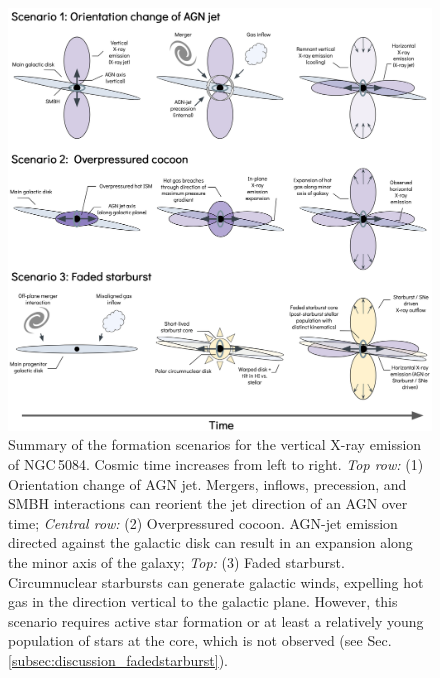 \documentclass[modern]{CORE-AAS/aastex631}
\begin{document}
\begin{figure}[t!]
\begin{center}
% 
\includegraphics[trim={0 0 0 0}, clip, width = \textwidth]{FIGURES/scenarios_figure.png}
\caption{Summary of the formation scenarios for the vertical X-ray emission of NGC\,5084. Cosmic time increases from left to right. \emph{Top row:} (1) Orientation change of AGN jet. Mergers, inflows, precession, and SMBH interactions can reorient the jet direction of an AGN over time; \emph{Central row:} (2) Overpressured cocoon. AGN-jet emission directed against the galactic disk can result in an expansion along the minor axis of the galaxy; \emph{Top:} (3) Faded starburst. Circumnuclear starbursts can generate galactic winds, expelling hot gas in the direction vertical to the galactic plane. However, this scenario requires active star formation or at least a relatively young population of stars at the core, which is not observed (see Sec.\,\ref{subsec:discussion_fadedstarburst}).} 
\label{fig:NGC5084_scenarios}
\end{center}
\end{figure}
\end{document}
